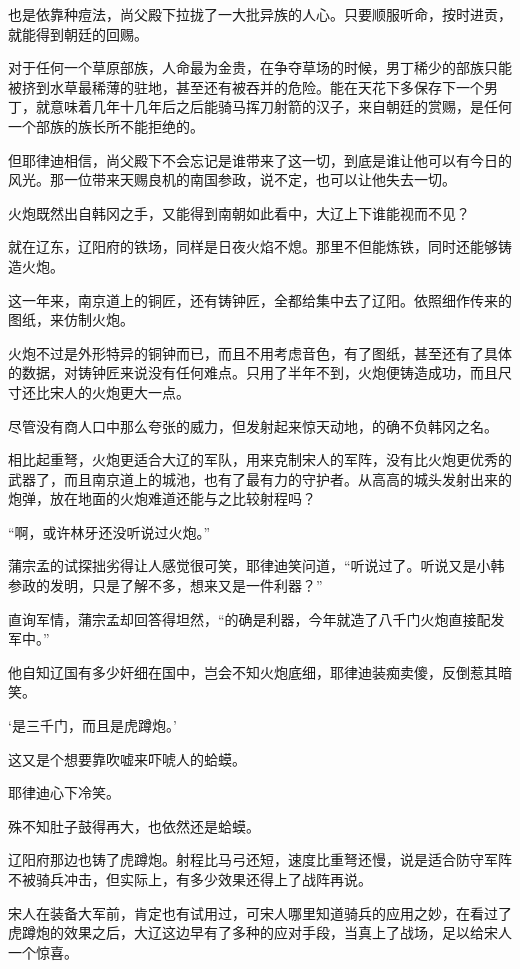 也是依靠种痘法，尚父殿下拉拢了一大批异族的人心。只要顺服听命，按时进贡，就能得到朝廷的回赐。

对于任何一个草原部族，人命最为金贵，在争夺草场的时候，男丁稀少的部族只能被挤到水草最稀薄的驻地，甚至还有被吞并的危险。能在天花下多保存下一个男丁，就意味着几年十几年后之后能骑马挥刀射箭的汉子，来自朝廷的赏赐，是任何一个部族的族长所不能拒绝的。

但耶律迪相信，尚父殿下不会忘记是谁带来了这一切，到底是谁让他可以有今日的风光。那一位带来天赐良机的南国参政，说不定，也可以让他失去一切。

火炮既然出自韩冈之手，又能得到南朝如此看中，大辽上下谁能视而不见？

就在辽东，辽阳府的铁场，同样是日夜火焰不熄。那里不但能炼铁，同时还能够铸造火炮。

这一年来，南京道上的铜匠，还有铸钟匠，全都给集中去了辽阳。依照细作传来的图纸，来仿制火炮。

火炮不过是外形特异的铜钟而已，而且不用考虑音色，有了图纸，甚至还有了具体的数据，对铸钟匠来说没有任何难点。只用了半年不到，火炮便铸造成功，而且尺寸还比宋人的火炮更大一点。

尽管没有商人口中那么夸张的威力，但发射起来惊天动地，的确不负韩冈之名。

相比起重弩，火炮更适合大辽的军队，用来克制宋人的军阵，没有比火炮更优秀的武器了，而且南京道上的城池，也有了最有力的守护者。从高高的城头发射出来的炮弹，放在地面的火炮难道还能与之比较射程吗？

“啊，或许林牙还没听说过火炮。”

蒲宗孟的试探拙劣得让人感觉很可笑，耶律迪笑问道，“听说过了。听说又是小韩参政的发明，只是了解不多，想来又是一件利器？”

直询军情，蒲宗孟却回答得坦然，“的确是利器，今年就造了八千门火炮直接配发军中。”

他自知辽国有多少奸细在国中，岂会不知火炮底细，耶律迪装痴卖傻，反倒惹其暗笑。

‘是三千门，而且是虎蹲炮。’

这又是个想要靠吹嘘来吓唬人的蛤蟆。

耶律迪心下冷笑。

殊不知肚子鼓得再大，也依然还是蛤蟆。

辽阳府那边也铸了虎蹲炮。射程比马弓还短，速度比重弩还慢，说是适合防守军阵不被骑兵冲击，但实际上，有多少效果还得上了战阵再说。

宋人在装备大军前，肯定也有试用过，可宋人哪里知道骑兵的应用之妙，在看过了虎蹲炮的效果之后，大辽这边早有了多种的应对手段，当真上了战场，足以给宋人一个惊喜。

